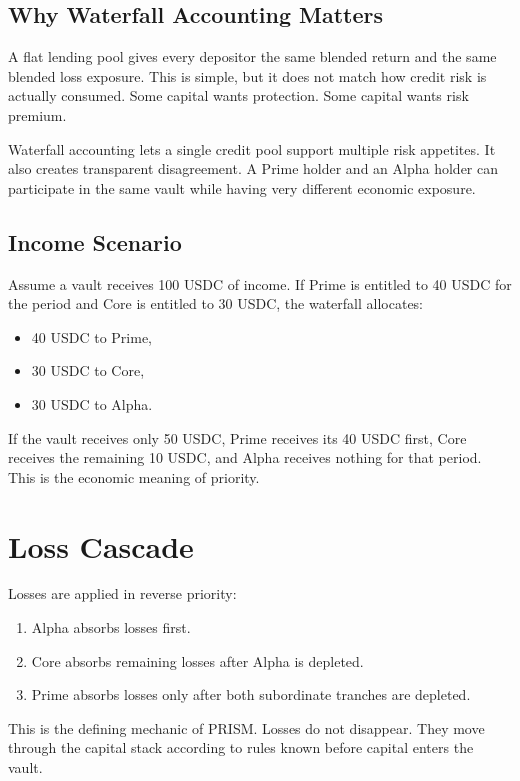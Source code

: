 \documentclass[11pt]{article}
\begin{document}
\subsection{Why Waterfall Accounting Matters}

A flat lending pool gives every depositor the same blended return and the same
blended loss exposure. This is simple, but it does not match how credit risk is
actually consumed. Some capital wants protection. Some capital wants risk
premium.

Waterfall accounting lets a single credit pool support multiple risk appetites.
It also creates transparent disagreement. A Prime holder and an Alpha holder can
participate in the same vault while having very different economic exposure.

\subsection{Income Scenario}

Assume a vault receives 100 USDC of income. If Prime is entitled to 40 USDC for
the period and Core is entitled to 30 USDC, the waterfall allocates:

\begin{itemize}
  \item 40 USDC to Prime,
  \item 30 USDC to Core,
  \item 30 USDC to Alpha.
\end{itemize}

If the vault receives only 50 USDC, Prime receives its 40 USDC first, Core
receives the remaining 10 USDC, and Alpha receives nothing for that period. This
is the economic meaning of priority.

\section{Loss Cascade}

Losses are applied in reverse priority:

\begin{enumerate}
  \item Alpha absorbs losses first.
  \item Core absorbs remaining losses after Alpha is depleted.
  \item Prime absorbs losses only after both subordinate tranches are depleted.
\end{enumerate}

This is the defining mechanic of PRISM. Losses do not disappear. They move
through the capital stack according to rules known before capital enters the
vault.
\end{document}
